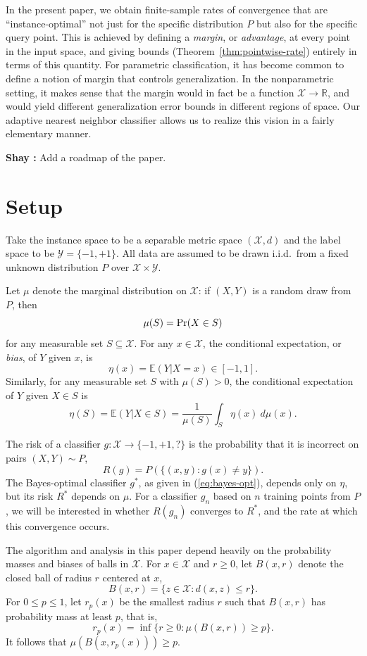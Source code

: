 \documentclass{article}
\def\R{{\mathbb{R}}}
\def\pr{{\rm Pr}}
\def\E{{\mathbb E}}
\def\X{{\mathcal X}}
\def\Y{{\mathcal Y}}
\newcommand{\comment}[3]{{\color{#1} {\bf #2 :} #3}}
\newcommand{\shay}[1]{\comment{purple}{Shay}{#1}}
\begin{document}
In the present paper, we obtain finite-sample rates of convergence that are ``instance-optimal'' not just for the specific distribution $P$ but also for the specific query point. This is achieved by defining a {\it margin}, or {\it advantage}, at every point in the input space, and giving bounds (Theorem~\ref{thm:pointwise-rate}) entirely in terms of this quantity. For parametric classification, it has become common to define a notion of margin that controls generalization. In the nonparametric setting, it makes sense that the margin would in fact be a function $\X \rightarrow \R$, and would yield different generalization error bounds in different regions of space. Our adaptive nearest neighbor classifier allows us to realize this vision in a fairly elementary manner.

\shay{Add a roadmap of the paper.}
\section{Setup}

Take the instance space to be a separable metric space $(\X, d)$ and the label space to be $\Y = \{-1,+1\}$. All data are assumed to be drawn i.i.d.\ from a fixed unknown distribution $P$ over $\X \times \Y$.

Let $\mu$ denote the marginal distribution on $\X$: if $(X,Y)$ is a 
random draw from $P$, then
$$ \mu(S) = \pr(X \in S)$$
for any measurable set $S \subseteq \X$. For any $x \in \X$, the conditional expectation, or {\em bias}, of $Y$ given $x$, is
$$ \eta(x) = \E(Y| X = x) \in [-1,1] .$$ 
Similarly, for any measurable set $S$ with $\mu(S) > 0$, the
conditional expectation of $Y$ given $X \in S$ is
$$ \eta(S) = \E(Y| X \in S) = \frac{1}{\mu(S)} \int_S \eta(x) \ d \mu(x) .$$

The risk of a classifier $g: \X \rightarrow \{-1,+1,?\}$ is the probability that it is incorrect on pairs $(X,Y) \sim P$,
\begin{equation}
R(g) = P(\{(x,y): g(x) \neq y\}).
\label{eq:risk}
\end{equation}
The Bayes-optimal classifier $g^*$, as given in (\ref{eq:bayes-opt}), depends only on $\eta$, but its risk $R^*$ depends on $\mu$. For a classifier $g_n$ based on $n$ training points from $P$, we will be interested in whether $R(g_n)$ converges to $R^*$, and the rate at which this convergence occurs.

The algorithm and analysis in this paper depend heavily on the probability masses and biases of balls in $\X$. For $x \in \X$ and $r \geq 0$, let $B(x,r)$ denote the closed ball of radius $r$ centered at $x$, 
$$ B(x,r) = \{ z \in \X : d(x,z) \leq r \} .$$
For $0 \leq p \leq 1$, let $r_p(x)$ be the smallest radius $r$ such that $B(x,r)$ has probability mass at least $p$, that is,
\begin{equation}
r_p(x) = \inf \{r \geq 0: \mu(B(x,r)) \geq p \}.
\label{eq:probability-radius}
\end{equation}
It follows that $\mu(B(x,r_p(x))) \geq p$.
\end{document}
